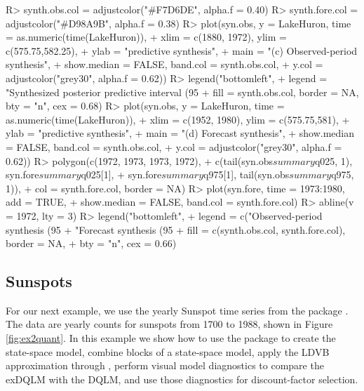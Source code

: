 \documentclass{jss}
\begin{document}
\begin{CodeChunk}
\begin{CodeInput}
R> synth.obs.col = adjustcolor("#F7D6DE", alpha.f = 0.40)
R> synth.fore.col = adjustcolor("#D98A9B", alpha.f = 0.38)
R> plot(syn.obs, y = LakeHuron, time = as.numeric(time(LakeHuron)),
+         xlim = c(1880, 1972), ylim = c(575.75,582.25),
+         ylab = "predictive synthesis",
+         main = "(c) Observed-period synthesis",
+         show.median = FALSE, band.col = synth.obs.col,
+         y.col = adjustcolor("grey30", alpha.f = 0.62))
R> legend("bottomleft",
+           legend = "Synthesized posterior predictive interval (95%
+           fill = synth.obs.col, border = NA, bty = "n", cex = 0.68)
R> plot(syn.obs, y = LakeHuron, time = as.numeric(time(LakeHuron)),
+         xlim = c(1952, 1980), ylim = c(575.75,581),
+         ylab = "predictive synthesis",
+         main = "(d) Forecast synthesis",
+         show.median = FALSE, band.col = synth.obs.col,
+         y.col = adjustcolor("grey30", alpha.f = 0.62))
R> polygon(c(1972, 1973, 1973, 1972),
+            c(tail(syn.obs$summary$q025, 1), syn.fore$summary$q025[1],
+                syn.fore$summary$q975[1], tail(syn.obs$summary$q975, 1)),
+            col = synth.fore.col, border = NA)
R> plot(syn.fore, time = 1973:1980, add = TRUE,
+         show.median = FALSE, band.col = synth.fore.col)
R> abline(v = 1972, lty = 3)
R> legend("bottomleft",
+           legend = c("Observed-period synthesis (95%
+                        "Forecast synthesis (95%
+           fill = c(synth.obs.col, synth.fore.col), border = NA,
+           bty = "n", cex = 0.66)
\end{CodeInput}
\end{CodeChunk}


\subsection{Sunspots}
\label{sec:ex2}

For our next example, we use the yearly Sunspot time series from the package . The data are yearly counts for sunspots from 1700 to 1988, shown in Figure \ref{fig:ex2quant}. In this example we show how to use the  package to create the state-space model, combine blocks of a state-space model, apply the LDVB approximation through , perform visual model diagnostics to compare the exDQLM with the DQLM, and use those diagnostics for discount-factor selection.
\end{document}

